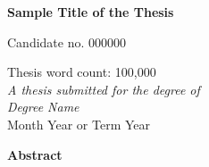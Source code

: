 \thispagestyle{empty}
\begin{alwayssingle}
    \begin{center}

    {\Large\bfseries Sample Title of the Thesis \par}
    {\large \vspace*{2ex} Candidate no. 000000 \par}
    {\large
        \vspace*{1ex}
        {Thesis word count: 100,000} \\
        \vspace*{1ex}
        {\it A thesis submitted for the degree of} \\
        {\it Degree Name} \\
        \vspace*{2ex}
        Month Year or Term Year \par
    }

        \vfill
        {\Large \bfseries Abstract}
    \end{center}

    \vspace{1ex}

    \noindent
    

    \vfill
\end{alwayssingle}
\restoregeometry

\setlength{\baselineskip}{\textbaselineskip}

%
%
%
%
%
%    
%
